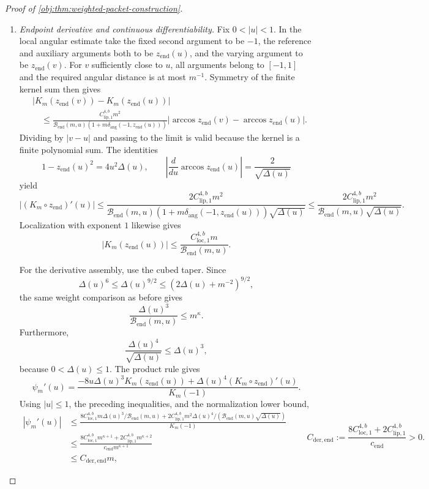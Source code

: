 \documentclass[11pt]{article}
\begin{document}
\begin{proof}[Proof of \cref{obj:thm:weighted-packet-construction}]
\begin{enumerate}
\item \emph{Endpoint derivative and continuous differentiability.}
Fix \(0<|u|<1\). In the local angular estimate take the fixed second argument to be \(-1\), the reference and auxiliary arguments both to be \(z_{\mathrm{end}}(u)\), and the varying argument to be \(z_{\mathrm{end}}(v)\). For \(v\) sufficiently close to \(u\), all arguments belong to \([-1,1]\) and the required angular distance is at most \(m^{-1}\). Symmetry of the finite kernel sum then gives
\[
\begin{split}
&|K_m(z_{\mathrm{end}}(v))-K_m(z_{\mathrm{end}}(u))|\\
&\quad\le
\frac{C_{\mathrm{lip},1}^{4,b}m^2}
{\mathcal B_{\mathrm{end}}(m,u)
 (1+m\delta_{\mathrm{ang}}(-1,z_{\mathrm{end}}(u)))}
|\arccos z_{\mathrm{end}}(v)-\arccos z_{\mathrm{end}}(u)|.
\end{split}
\]
Dividing by \(|v-u|\) and passing to the limit is valid because the kernel is a finite polynomial sum. The identities
\[
1-z_{\mathrm{end}}(u)^2=4u^2\Delta(u),
\qquad
\left|\frac{d}{du}\arccos z_{\mathrm{end}}(u)\right|
=\frac2{\sqrt{\Delta(u)}}
\]
yield
\[
|(K_m\circ z_{\mathrm{end}})'(u)|
\le
\frac{2C_{\mathrm{lip},1}^{4,b}m^2}
{\mathcal B_{\mathrm{end}}(m,u)
 (1+m\delta_{\mathrm{ang}}(-1,z_{\mathrm{end}}(u)))
 \sqrt{\Delta(u)}}
\le
\frac{2C_{\mathrm{lip},1}^{4,b}m^2}
{\mathcal B_{\mathrm{end}}(m,u)\sqrt{\Delta(u)}}.
\]
Localization with exponent \(1\) likewise gives
\[
|K_m(z_{\mathrm{end}}(u))|
\le
\frac{C_{\mathrm{loc},1}^{4,b}m}
{\mathcal B_{\mathrm{end}}(m,u)}.
\]

For the derivative assembly, use the cubed taper. Since
\[
\Delta(u)^6
\le\Delta(u)^{9/2}
\le(2\Delta(u)+m^{-2})^{9/2},
\]
the same weight comparison as before gives
\[
\frac{\Delta(u)^3}{\mathcal B_{\mathrm{end}}(m,u)}
\le m^\kappa.
\]
Furthermore,
\[
\frac{\Delta(u)^4}{\sqrt{\Delta(u)}}\le\Delta(u)^3,
\]
because \(0<\Delta(u)\le1\). The product rule gives
\[
\psi_m'(u)=
\frac{-8u\Delta(u)^3K_m(z_{\mathrm{end}}(u))
+\Delta(u)^4(K_m\circ z_{\mathrm{end}})'(u)}
{K_m(-1)}.
\]
Using \(|u|\le1\), the preceding inequalities, and the normalization lower bound,
\[
\begin{split}
|\psi_m'(u)|
&\le
\frac{
8C_{\mathrm{loc},1}^{4,b}m
 \Delta(u)^3/\mathcal B_{\mathrm{end}}(m,u)
+
2C_{\mathrm{lip},1}^{4,b}m^2
 \Delta(u)^4/(\mathcal B_{\mathrm{end}}(m,u)\sqrt{\Delta(u)})
}{K_m(-1)}\\
&\le
\frac{8C_{\mathrm{loc},1}^{4,b}m^{\kappa+1}
      +2C_{\mathrm{lip},1}^{4,b}m^{\kappa+2}}
     {c_{\mathrm{end}}m^{\kappa+1}}\\
&\le C_{\mathrm{der,end}}m,
\end{split}
\qquad
C_{\mathrm{der,end}}
:=
\frac{8C_{\mathrm{loc},1}^{4,b}
      +2C_{\mathrm{lip},1}^{4,b}}{c_{\mathrm{end}}}>0.
\]


\end{enumerate}
\end{proof}
\end{document}
